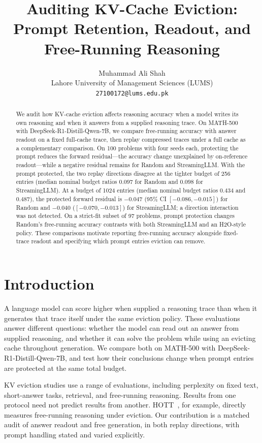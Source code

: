 \documentclass{article}
\title{Auditing KV-Cache Eviction:\\
Prompt Retention, Readout, and Free-Running Reasoning}
\author{Muhammad Ali Shah\\
Lahore University of Management Sciences (LUMS)\\
\texttt{27100172@lums.edu.pk}}
\date{}
\begin{document}
\maketitle

\begin{abstract}
We audit how KV-cache eviction affects reasoning accuracy when a model writes its own reasoning and when it answers from a supplied reasoning trace. On MATH-500 with DeepSeek-R1-Distill-Qwen-7B, we compare free-running accuracy with answer readout on a fixed full-cache trace, then replay compressed traces under a full cache as a complementary comparison. On 100 problems with four seeds each, protecting the prompt reduces the forward residual---the accuracy change unexplained by on-reference readout---while a negative residual remains for Random and StreamingLLM. With the prompt protected, the two replay directions disagree at the tighter budget of 256 entries (median nominal budget ratios $0.097$ for Random and $0.098$ for StreamingLLM). At a budget of 1024 entries (median nominal budget ratios $0.434$ and $0.487$), the protected forward residual is $-0.047$ (95\% CI $[-0.086,-0.015]$) for Random and $-0.040$ ($[-0.070,-0.013]$) for StreamingLLM; a direction interaction was not detected. On a strict-fit subset of 97 problems, prompt protection changes Random's free-running accuracy contrasts with both StreamingLLM and an H2O-style policy. These comparisons motivate reporting free-running accuracy alongside fixed-trace readout and specifying which prompt entries eviction can remove.
\end{abstract}

\section{Introduction}
\label{sec:intro}

A language model can score higher when supplied a reasoning trace than when it generates that trace itself under the same eviction policy. These evaluations answer different questions: whether the model can read out an answer from supplied reasoning, and whether it can solve the problem while using an evicting cache throughout generation. We compare both on MATH-500 with DeepSeek-R1-Distill-Qwen-7B, and test how their conclusions change when prompt entries are protected at the same total budget.

KV eviction studies use a range of evaluations, including perplexity on fixed text, short-answer tasks, retrieval, and free-running reasoning. Results from one protocol need not predict results from another. HOTT~\citep{hott2025}, for example, directly measures free-running reasoning under eviction. Our contribution is a matched audit of answer readout and free generation, in both replay directions, with prompt handling stated and varied explicitly.
\end{document}
